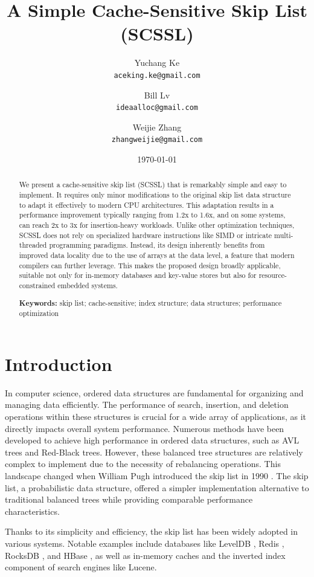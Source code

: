 \documentclass{article}
\title{A Simple Cache-Sensitive Skip List (SCSSL)}
\author{Yuchang Ke \\
\texttt{aceking.ke@gmail.com}
\and Bill Lv \\
\texttt{ideaalloc@gmail.com}
\and Weijie Zhang\\
\texttt{zhangweijie@gmail.com}}
\date{\today}
\newcommand{\keywords}[1]{\par\noindent\textbf{Keywords:} #1}
\begin{document}
\maketitle

\begin{abstract}
We present a cache-sensitive skip list (SCSSL) that is remarkably simple and easy to implement. It requires only minor modifications to the original skip list data structure to adapt it effectively to modern CPU architectures. This adaptation results in a performance improvement typically ranging from 1.2x to 1.6x, and on some systems, can reach 2x to 3x for insertion-heavy workloads.
Unlike other optimization techniques, SCSSL does not rely on specialized hardware instructions like SIMD or intricate multi-threaded programming paradigms. Instead, its design inherently benefits from improved data locality due to the use of arrays at the data level, a feature that modern compilers can further leverage. This makes the proposed design broadly applicable, suitable not only for in-memory databases and key-value stores but also for resource-constrained embedded systems.
\keywords{skip list; cache-sensitive; index structure; data structures; performance optimization}
\end{abstract}

\section{Introduction}
\label{sec:introduction}

In computer science, ordered data structures are fundamental for organizing and managing data efficiently. The performance of search, insertion, and deletion operations within these structures is crucial for a wide array of applications, as it directly impacts overall system performance.
Numerous methods have been developed to achieve high performance in ordered data structures, such as AVL trees and Red-Black trees. However, these balanced tree structures are relatively complex to implement due to the necessity of rebalancing operations. This landscape changed when William Pugh introduced the skip list in 1990 \cite{Pugh1990}. The skip list, a probabilistic data structure, offered a simpler implementation alternative to traditional balanced trees while providing comparable performance characteristics.

Thanks to its simplicity and efficiency, the skip list has been widely adopted in various systems. Notable examples include databases like LevelDB \cite{LevelDB}, Redis \cite{Redis}, RocksDB \cite{RocksDB}, and HBase \cite{HBase}, as well as in-memory caches and the inverted index component of search engines like Lucene.
\end{document}
